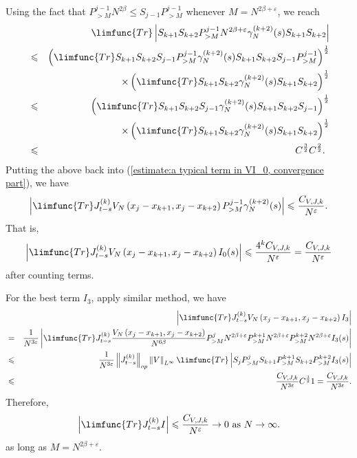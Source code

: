 \documentclass[12pt,letterpaper,leqno]{amsart}
\theoremstyle{plain}
\numberwithin{equation}{section}
\numberwithin{theorem}{section}
\numberwithin{proposition}{section}
\numberwithin{lemma}{section}
\numberwithin{corollary}{section}
\begin{document}
Using the fact that $P_{>M}^{j-1}N^{2\beta }\leqslant S_{j-1}P_{>M}^{j-1}$
whenever $M=N^{2\beta +\varepsilon }$, we reach%
\begin{eqnarray*}
&&\limfunc{Tr}\left\vert S_{k+1}S_{k+2}P_{>M}^{j-1}N^{2\beta +\varepsilon
}\gamma _{N}^{(k+2)}(s)S_{k+1}S_{k+2}\right\vert \\
&\leqslant &\left( \limfunc{Tr}S_{k+1}S_{k+2}S_{j-1}P_{>M}^{j-1}\gamma
_{N}^{(k+2)}(s)S_{k+1}S_{k+2}S_{j-1}P_{>M}^{j-1}\right) ^{\frac{1}{2}} \\
&&\times \left( \limfunc{Tr}S_{k+1}S_{k+2}\gamma
_{N}^{(k+2)}(s)S_{k+1}S_{k+2}\right) ^{\frac{1}{2}} \\
&\leqslant &\left( \limfunc{Tr}S_{k+1}S_{k+2}S_{j-1}\gamma
_{N}^{(k+2)}(s)S_{k+1}S_{k+2}S_{j-1}\right) ^{\frac{1}{2}} \\
&&\times \left( \limfunc{Tr}S_{k+1}S_{k+2}\gamma
_{N}^{(k+2)}(s)S_{k+1}S_{k+2}\right) ^{\frac{1}{2}} \\
&\leqslant &C^{\frac{3}{2}}C^{\frac{2}{2}}\text{. }
\end{eqnarray*}%
Putting the above back into (\ref{estimate:a typical term in VI_0,
convergence part}), we have 
\begin{equation*}
\left\vert \limfunc{Tr}J_{t-s}^{(k)}V_{N}\left(
x_{j}-x_{k+1},x_{j}-x_{k+2}\right) P_{>M}^{j-1}\gamma
_{N}^{(k+2)}(s)\right\vert \leqslant \frac{C_{V,J,k}}{N^{\varepsilon }}.
\end{equation*}%
That is, 
\begin{equation*}
\left\vert \limfunc{Tr}J_{t-s}^{(k)}V_{N}\left(
x_{j}-x_{k+1},x_{j}-x_{k+2}\right) I_{0}(s)\right\vert \leqslant \frac{%
4^{k}C_{V,J,k}}{N^{\varepsilon }}=\frac{C_{V,J,k}}{N^{\varepsilon }}
\end{equation*}%
after counting terms.

For the best term $I_{3}$, apply similar method, we have 
\begin{eqnarray*}
&&\left\vert \limfunc{Tr}J_{t-s}^{(k)}V_{N}\left(
x_{j}-x_{k+1},x_{j}-x_{k+2}\right) I_{3}\right\vert \\
&=&\frac{1}{N^{3\varepsilon }}\left\vert \limfunc{Tr}J_{t-s}^{(k)}\frac{%
V_{N}\left( x_{j}-x_{k+1},x_{j}-x_{k+2}\right) }{N^{6\beta }}%
P_{>M}^{j}N^{2\beta +\varepsilon }P_{>M}^{k+1}N^{2\beta +\varepsilon
}P_{>M}^{k+2}N^{2\beta +\varepsilon }I_{3}(s)\right\vert \\
&\leqslant &\frac{1}{N^{3\varepsilon }}\left\Vert J_{t-s}^{(k)}\right\Vert
_{op}\left\Vert V\right\Vert _{L^{\infty }}\limfunc{Tr}\left\vert
S_{j}P_{>M}^{j}S_{k+1}P_{>M}^{k+1}S_{k+2}P_{>M}^{k+2}I_{3}(s)\right\vert \\
&\leqslant &\frac{C_{V,J,k}}{N^{3\varepsilon }}C^{\frac{3}{2}}1=\frac{%
C_{V,J,k}}{N^{3\varepsilon }}\text{.}
\end{eqnarray*}%
Therefore,%
\begin{equation*}
\left\vert \limfunc{Tr}J_{t-s}^{(k)}I\right\vert \leqslant \frac{C_{V,J,k}}{%
N^{\varepsilon }}\rightarrow 0\text{ as }N\rightarrow \infty \text{.}
\end{equation*}%
as long as $M=N^{2\beta +\varepsilon }$.
\end{document}
